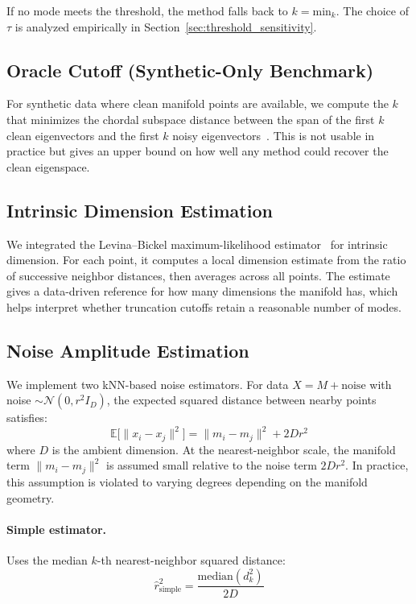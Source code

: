 \documentclass{article}
\begin{document}
If no mode meets the threshold, the method falls back to $k = \text{min}_k$. The choice of $\tau$ is analyzed empirically in Section~\ref{sec:threshold_sensitivity}.

\subsection{Oracle Cutoff (Synthetic-Only Benchmark)}

For synthetic data where clean manifold points are available, we compute the $k$ that minimizes the chordal subspace distance between the span of the first $k$ clean eigenvectors and the first $k$ noisy eigenvectors~\citep{elkaroui2016connection}. This is not usable in practice but gives an upper bound on how well any method could recover the clean eigenspace.

\subsection{Intrinsic Dimension Estimation}

We integrated the Levina--Bickel maximum-likelihood estimator~\citep{levina2004maximum} for intrinsic dimension. For each point, it computes a local dimension estimate from the ratio of successive neighbor distances, then averages across all points. The estimate gives a data-driven reference for how many dimensions the manifold has, which helps interpret whether truncation cutoffs retain a reasonable number of modes.

\subsection{Noise Amplitude Estimation}
\label{sec:noise_est_methods}

We implement two kNN-based noise estimators. For data $X = M + \text{noise}$ with noise $\sim \mathcal{N}(0, r^2 I_D)$, the expected squared distance between nearby points satisfies:
\begin{equation}
\mathbb{E}\bigl[\|x_i - x_j\|^2\bigr] = \|m_i - m_j\|^2 + 2Dr^2
\label{eq:expected_distance}
\end{equation}
where $D$ is the ambient dimension. At the nearest-neighbor scale, the manifold term $\|m_i - m_j\|^2$ is assumed small relative to the noise term $2Dr^2$. In practice, this assumption is violated to varying degrees depending on the manifold geometry.

\paragraph{Simple estimator.} Uses the median $k$-th nearest-neighbor squared distance:
\begin{equation}
\hat{r}_{\text{simple}}^2 = \frac{\mathrm{median}(d_k^2)}{2D}
\label{eq:simple_estimator}
\end{equation}
\end{document}
